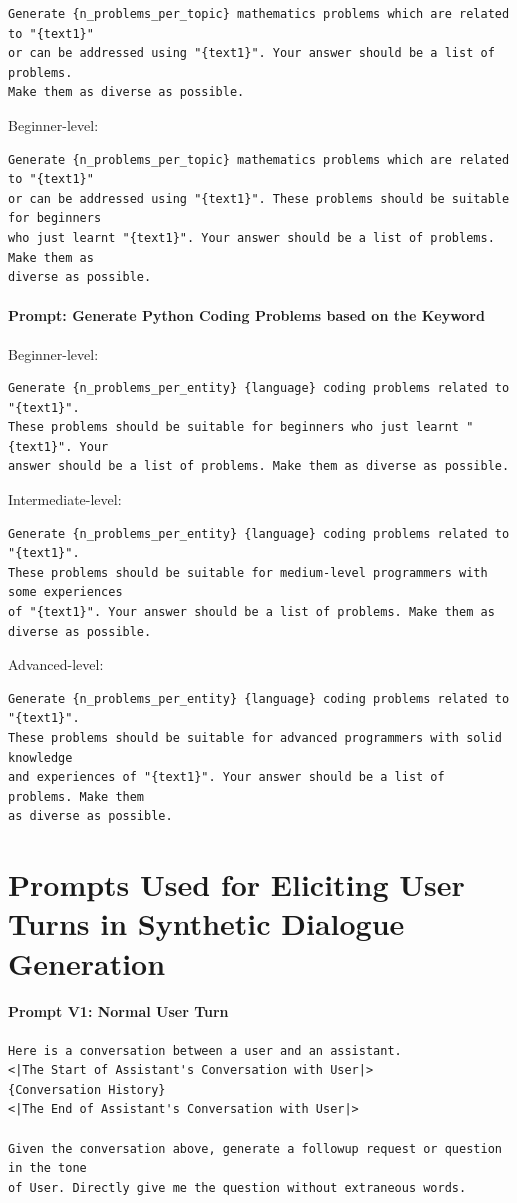 \documentclass[11pt]{article}
\begin{document}
\begin{verbatim}
Generate {n_problems_per_topic} mathematics problems which are related to "{text1}" 
or can be addressed using "{text1}". Your answer should be a list of problems. 
Make them as diverse as possible.
\end{verbatim}
Beginner-level:
\begin{verbatim}
Generate {n_problems_per_topic} mathematics problems which are related to "{text1}" 
or can be addressed using "{text1}". These problems should be suitable for beginners
who just learnt "{text1}". Your answer should be a list of problems. Make them as 
diverse as possible.
\end{verbatim}


\paragraph{Prompt: Generate Python Coding Problems based on the Keyword}  

Beginner-level:
\begin{verbatim}
Generate {n_problems_per_entity} {language} coding problems related to "{text1}". 
These problems should be suitable for beginners who just learnt "{text1}". Your 
answer should be a list of problems. Make them as diverse as possible.
\end{verbatim}
Intermediate-level:
\begin{verbatim}
Generate {n_problems_per_entity} {language} coding problems related to "{text1}". 
These problems should be suitable for medium-level programmers with some experiences
of "{text1}". Your answer should be a list of problems. Make them as diverse as possible.
\end{verbatim}
Advanced-level:
\begin{verbatim}
Generate {n_problems_per_entity} {language} coding problems related to "{text1}". 
These problems should be suitable for advanced programmers with solid knowledge 
and experiences of "{text1}". Your answer should be a list of problems. Make them
as diverse as possible.
\end{verbatim}

\section{Prompts Used for Eliciting User Turns in Synthetic Dialogue Generation }
\label{sup:data-syn-user}
\paragraph{Prompt V1: Normal User Turn}
\begin{verbatim}
Here is a conversation between a user and an assistant.
<|The Start of Assistant's Conversation with User|>
{Conversation History}
<|The End of Assistant's Conversation with User|>

Given the conversation above, generate a followup request or question in the tone
of User. Directly give me the question without extraneous words.
\end{verbatim}
\end{document}
